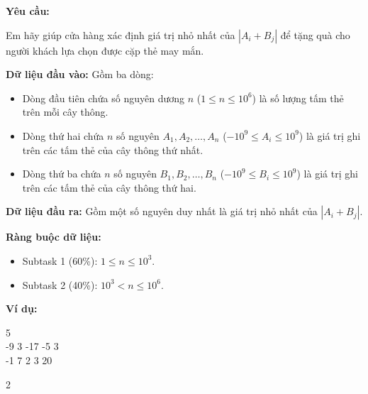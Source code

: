 \documentclass[12pt]{scrartcl}  %
\begin{document}
\textbf{Yêu cầu:}

Em hãy giúp cửa hàng xác định giá trị nhỏ nhất của $|A_i + B_j|$ để tặng quà cho người khách lựa chọn được cặp thẻ may mắn.

\textbf{Dữ liệu đầu vào:}
Gồm ba dòng:
\begin{itemize}
    \item Dòng đầu tiên chứa số nguyên dương $n$ ($1 \leq n \leq 10^6$) là số lượng tấm thẻ trên mỗi cây thông.
    \item Dòng thứ hai chứa $n$ số nguyên $A_1, A_2, \ldots, A_n$ ($-10^9 \leq A_i \leq 10^9$) là giá trị ghi trên các tấm thẻ của cây thông thứ nhất.
    \item Dòng thứ ba chứa $n$ số nguyên $B_1, B_2, \ldots, B_n$ ($-10^9 \leq B_i \leq 10^9$) là giá trị ghi trên các tấm thẻ của cây thông thứ hai.
\end{itemize}

\textbf{Dữ liệu đầu ra:}
Gồm một số nguyên duy nhất là giá trị nhỏ nhất của $|A_i + B_j|$.

\textbf{Ràng buộc dữ liệu:}
\begin{itemize}
    \item Subtask 1 (60\%): $1 \leq n \leq 10^3$.
    \item Subtask 2 (40\%): $10^3 < n \leq 10^6$.
\end{itemize}

\textbf{Ví dụ:}
\begin{tcolorbox}[colback=gray!5!white, colframe=blue!50!black, title=Input]
5\\
-9 3 -17 -5 3\\
-1 7 2 3 20
\end{tcolorbox}
\begin{tcolorbox}[colback=gray!5!white, colframe=green!50!black, title=Output]
2
\end{tcolorbox}
\end{document}
